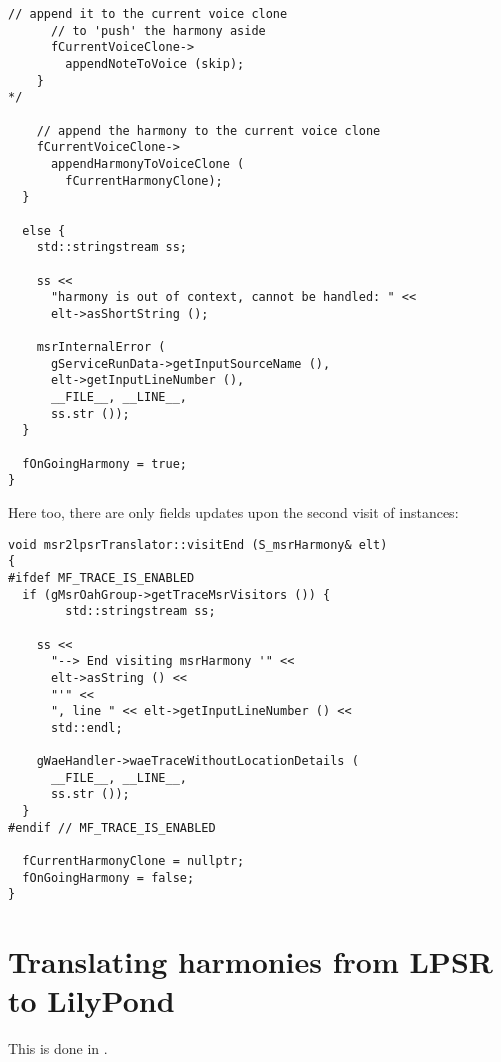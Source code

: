 \begin{lstlisting}[language=CPlusPlus]
      // append it to the current voice clone
      // to 'push' the harmony aside
      fCurrentVoiceClone->
        appendNoteToVoice (skip);
    }
*/

    // append the harmony to the current voice clone
    fCurrentVoiceClone->
      appendHarmonyToVoiceClone (
        fCurrentHarmonyClone);
  }

  else {
    std::stringstream ss;

    ss <<
      "harmony is out of context, cannot be handled: " <<
      elt->asShortString ();

    msrInternalError (
      gServiceRunData->getInputSourceName (),
      elt->getInputLineNumber (),
      __FILE__, __LINE__,
      ss.str ());
  }

  fOnGoingHarmony = true;
}
\end{lstlisting}

\pagebreak

Here too, there are only fields updates upon the second visit of  instances:
\begin{lstlisting}[language=CPlusPlus]
void msr2lpsrTranslator::visitEnd (S_msrHarmony& elt)
{
#ifdef MF_TRACE_IS_ENABLED
  if (gMsrOahGroup->getTraceMsrVisitors ()) {
		std::stringstream ss;

    ss <<
      "--> End visiting msrHarmony '" <<
      elt->asString () <<
      "'" <<
      ", line " << elt->getInputLineNumber () <<
      std::endl;

    gWaeHandler->waeTraceWithoutLocationDetails (
      __FILE__, __LINE__,
      ss.str ());
  }
#endif // MF_TRACE_IS_ENABLED

  fCurrentHarmonyClone = nullptr;
  fOnGoingHarmony = false;
}
\end{lstlisting}


\section{Translating harmonies from LPSR to LilyPond}

This is done in \lpsrToLilypond{}.

